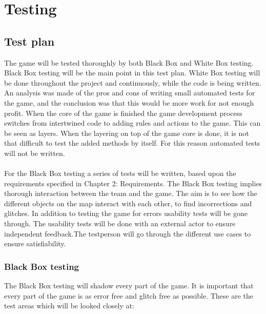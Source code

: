 \chapter{Testing}
\section{Test plan}
The game will be tested thoroughly by both Black Box and White Box testing. Black Box testing will be the main point in this test plan. White Box testing will be done throughout the project and continuously, while the code is being written. An analysis was made of the pros and cons of writing small automated tests for the game, and the conclusion was that this would be more work for not enough profit. When the core of the game is finished the game development process switches from intertwined code to adding rules and actions to the game. This can be seen as layers. When the layering on top of the game core is done, it is not that difficult to test the added methods by itself. For this reason automated tests will not be written.\\
\\
For the Black Box testing a series of tests will be written, based upon the requirements specified in Chapter 2: Requirements. The Black Box testing implies thorough interaction between the team and the game. The aim is to see how the different objects on the map interact with each other, to find incorrections and glitches. In addition to testing the game for errors usability tests will be gone through. The usability tests will be done with an external actor to ensure independent feedback.The testperson will go through the different use cases to ensure satisfiability. \\

\subsection{Black Box testing}

The Black Box testing will shadow every part of the game. It is important that every part of the game is as error free and glitch free as possible. These are the test areas which will be looked closely at:

